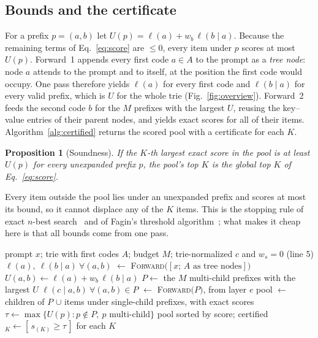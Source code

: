 \documentclass[sigconf,anonymous]{acmart}
\newcommand{\lp}{\ell}
\newcommand{\U}{U}
\newtheorem{proposition}{Proposition}
\begin{document}
\subsection{Bounds and the certificate}
\label{sec:certified}
For a prefix $p=(a,b)$ let $\U(p)=\lp(a)+w_b\,\lp(b\mid a)$. Because the remaining terms of Eq.~\ref{eq:score} are
$\le0$, every item under $p$ scores at most $\U(p)$. Forward~1 appends every first code $a\in A$ to the prompt as
a \emph{tree node}: node $a$ attends to the prompt and to itself, at the position the first code would occupy.
One pass therefore yields $\lp(a)$ for every first code and $\lp(b\mid a)$ for every valid prefix, which is $\U$
for the whole trie (Fig.~\ref{fig:overview}). Forward~2 feeds the second code $b$ for the $M$ prefixes with the
largest $\U$, reusing the key--value entries of their parent nodes, and yields exact scores for all of their items.
Algorithm~\ref{alg:certified} returns the scored pool with a certificate for each $K$.

\begin{proposition}[Soundness]\label{prop:sound}
If the $K$-th largest exact score in the pool is at least $\U(p)$ for every unexpanded prefix $p$, the pool's top
$K$ is the global top $K$ of Eq.~\ref{eq:score}.
\end{proposition}
\noindent Every item outside the pool lies under an unexpanded prefix and scores at most its bound, so it cannot
displace any of the $K$ items. This is the stopping rule of exact $n$-best search~\cite{stahlberg2022} and of
Fagin's threshold algorithm~\cite{fagin2003}; what makes it cheap here is that all bounds come from one pass.

\begin{algorithm}[t]
\caption{Certified exact top-$K$ (one request)}
\label{alg:certified}
\small
\begin{algorithmic}[1]
\Require prompt $x$; trie with first codes $A$; budget $M$; trie-normalized $c$ and $w_s=0$ (line 5)
\State $\lp(a),\ \lp(b\mid a)\ \forall (a,b)$ $\gets$ \textsc{Forward}$\big([x;\,A \text{ as tree nodes}]\big)$
\State $\U(a,b) \gets \lp(a) + w_b\,\lp(b\mid a)$ 
\State $P \gets$ the $M$ multi-child prefixes with the largest $\U$
\State $\lp(c\mid a,b)\ \forall (a,b)\in P$ $\gets$ \textsc{Forward}$\big(P\big)$, from layer $e$ \Comment{\S\ref{sec:late}}
\State pool $\gets$ children of $P$ $\cup$ items under single-child prefixes, with exact scores
\State $\tau \gets \max\{\U(p) : p \notin P,\ p \text{ multi-child}\}$
\State \Return pool sorted by score; certified$_K \gets [\,s_{(K)} \ge \tau\,]$ for each $K$
\end{algorithmic}
\end{algorithm}
\end{document}
